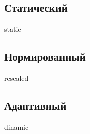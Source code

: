 
\subsection{Статический}

{static}

\subsection{Нормированный}

{rescaled}

\subsection{Адаптивный}

{dinamic}

